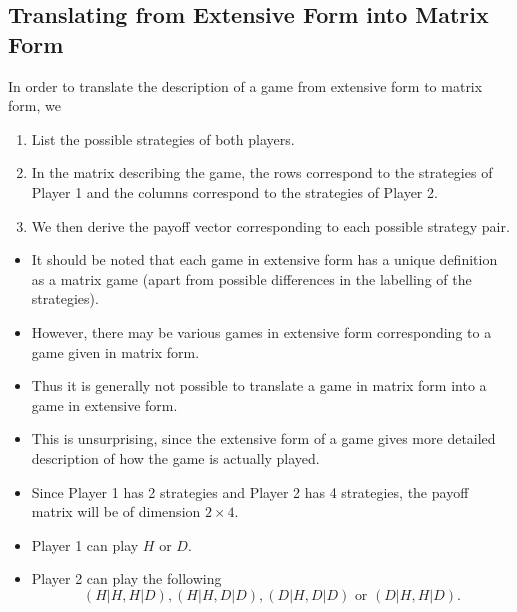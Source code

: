 \documentclass[]{report}
\begin{document}
\subsection{Translating from Extensive Form into Matrix Form}
In order to translate the description of a game from extensive form
to matrix form, we
\begin{enumerate}
\item  List the possible strategies of both players.
\item In the matrix describing the game, the rows
correspond to the strategies of Player 1 and the
columns correspond to the strategies of Player 2.
\item We then derive the payoff vector corresponding to
each possible strategy pair.
\end{enumerate}
\begin{itemize}
	\item It should be noted that each game in extensive form has a unique
	definition as a matrix game (apart from possible differences in the
	labelling of the strategies).
\item However, there may be various games in extensive form
	corresponding to a game given in matrix form. 
\item Thus it is generally
	not possible to translate a game in matrix form into a game in
	extensive form.
\item This is unsurprising, since the extensive form of a game gives more
	detailed description of how the game is actually played.
\end{itemize}


\begin{itemize}
	\item Since Player 1 has 2 strategies and Player 2 has 4 strategies, the
	payoff matrix will be of dimension $2 \times 4$.
	\item Player 1 can play $H$ or $D$.
	\item 	Player 2 can play the following \[(H|H, H|D), (H|H, D|D), (D|H, D|D) \mbox{ or }
	(D|H, H|D). \]
\end{itemize}
\end{document}
